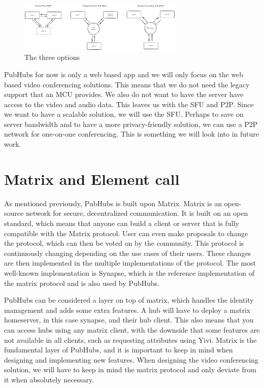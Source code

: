 \documentclass{report}
\begin{document}
\begin{figure}[!hbt]
\centering
\includegraphics[width=0.7\textwidth]{img/thesisDPD}
\caption{The three options}
\label{fig:three-options-video-conferencing}
\end{figure}

PubHubs for now is only a web based app and we will only focus on the web based video conferencing solutions. This means
that we do not need the legacy support that an MCU provides. We also do not want to have the server have access to the
video and audio data. This leaves us with the SFU and P2P. Since we want to have a scalable solution, we will use the SFU.
Perhaps to save on server bandwidth and to have a more privacy-friendly solution, we can use a P2P network for one-on-one
conferencing. This is something we will look into in future work.

\section{Matrix and Element call}
\label{sec:matrix}
As mentioned previously, PubHubs is built upon Matrix. Matrix is an open-source network for secure, decentralized
communication. It is built on an open standard, which means that anyone can build a client or server that is fully
compatible with the Matrix protocol. User can even make proposals to change the protocol, which can then be voted on
by the community. This protocol is continuously changing depending on the use cases of their users. These changes
are then implemented in the multiple implementations of the protocol. The most well-known implementation is Synapse,
which is the reference implementation of the matrix protocol and is also used by PubHubs.

PubHubs can be considered a layer on top of matrix, which handles the identity management and adds some extra features.
A hub will have to deploy a matrix homeserver, in this case synapse, and their hub client. This also means that you can
access hubs using any matrix client, with the downside that some features are not available in all clients, such as
requesting attributes using Yivi. Matrix is the fundamental layer of PubHubs, and it is important to keep in mind
when designing and implementing new features. When designing the video conferencing solution, we will have to keep
in mind the matrix protocol and only deviate from it when absolutely necessary.
\end{document}
